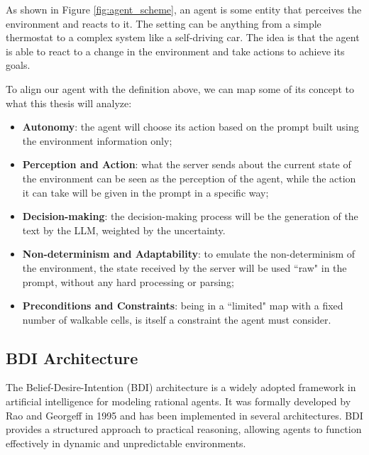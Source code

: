 As shown in Figure \ref{fig:agent_scheme}, an agent is some entity that
perceives the environment and reacts to it. The setting can be anything from a simple
thermostat to a complex system like a self-driving car. The idea is that the
agent is able to react to a change in the environment and take actions to
achieve its goals.

To align our agent with the definition above, we can map some of its concept to what
this thesis will analyze:
\begin{itemize}
  \item \textbf{Autonomy}: the agent will choose its action based on the prompt built
    using the environment information only;

  \item \textbf{Perception and Action}: what the server sends about the current state
    of the environment can be seen as the perception of the agent, while the
    action it can take will be given in the prompt in a specific way;

  \item \textbf{Decision-making}: the decision-making process will be the generation
    of the text by the LLM, weighted by the uncertainty.

  \item \textbf{Non-determinism and Adaptability}: to emulate the non-determinism
    of the environment, the state received by the server will be used ``raw" in the
    prompt, without any hard processing or parsing;

  \item \textbf{Preconditions and Constraints}: being in a ``limited" map with a
    fixed number of walkable cells, is itself a constraint the agent must consider.
\end{itemize}

\subsection{BDI Architecture}
\label{sub:bdi_architecture}

The Belief-Desire-Intention (BDI) architecture is a widely adopted framework in
artificial intelligence for modeling rational agents. It was formally developed by
Rao and Georgeff in 1995 \cite{bdi-icmas95} and has been implemented in several architectures.
BDI provides a structured approach to practical reasoning, allowing agents to function
effectively in dynamic and unpredictable environments.

